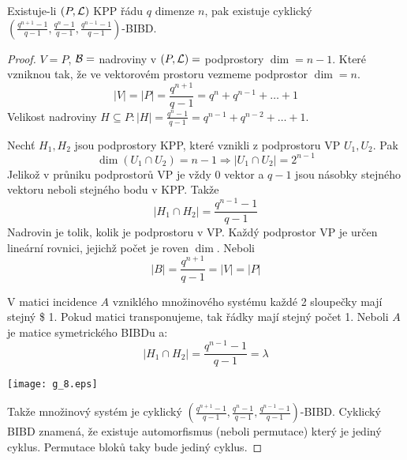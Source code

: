 \begin{theorem}
    Existuje-li $(P,\operatorname{\mathcal{L}})$ KPP řádu $q$ dimenze $n$, pak existuje cyklický $(\frac{q^{n+1}-1}{q-1},\frac{q^n-1}{q-1},\frac{q^{n-1}-1}{q-1})$-BIBD.
\end{theorem}
\begin{proof}
	$V = P$, $\operatorname{\mathcal{B}} = $ nadroviny v $(P, \operatorname{\mathcal{L}}) = $ podprostory $\dim = n - 1$.
	Které vzniknou tak, že ve vektorovém prostoru vezmeme podprostor $\dim = n$.
	\[ |V| = |P| = \frac{q^{n + 1}}{q - 1} = q^n + q^{n - 1} + \ldots + 1 \]
	Velikost nadroviny $H \subseteq P: |H| = \frac{q^n - 1}{q - 1} = q^{n - 1} + q^{n - 2} + \ldots + 1$.

	Nechť $H_1, H_2$ jsou podprostory KPP, které vznikli z podprostoru VP $U_1, U_2$.
	Pak
	\[ \dim(U_1 \cap U_2) = n - 1 \Rightarrow |U_1 \cap U_2| = 2^{n - 1} \]
	Jelikož v průniku podprostorů VP je vždy 0 vektor a $q - 1$ jsou násobky stejného vektoru neboli stejného bodu v KPP.
	Takže
	\[ |H_1 \cap H_2| = \frac{q^{n - 1} - 1}{q - 1} \]
	Nadrovin je tolik, kolik je podprostoru v VP.
	Každý podprostor VP je určen lineární rovnici, jejichž počet je roven $\dim$.
	Neboli
	\[ |B| = \frac{q^{n + 1}}{q - 1} = |V| = |P| \]

	V matici incidence $A$ vzniklého množinového systému každé 2 sloupečky mají stejný \$ 1.
	Pokud matici transponujeme, tak řádky mají stejný počet 1.
	Neboli $A$ je matice symetrického BIBDu a:
	\[ |H_1 \cap H_2| = \frac{q^{n - 1} - 1}{q - 1} = \lambda \]

    	\texttt{[image: g\_8.eps]}

	Takže množinový systém je cyklický $(\frac{q^{n+1}-1}{q-1},\frac{q^n-1}{q-1},\frac{q^{n-1}-1}{q-1})$-BIBD.
	Cyklický BIBD znamená, že existuje automorfismus (neboli permutace) který je jediný cyklus.
	Permutace bloků taky bude jediný cyklus.
\end{proof}


